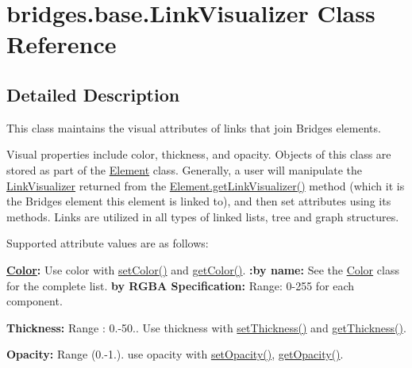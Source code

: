 \hypertarget{classbridges_1_1base_1_1_link_visualizer}{}\section{bridges.\+base.\+Link\+Visualizer Class Reference}
\label{classbridges_1_1base_1_1_link_visualizer}


\subsection{Detailed Description}
This class maintains the visual attributes of links that join Bridges elements. 

Visual properties include color, thickness, and opacity. Objects of this class are stored as part of the \hyperlink{classbridges_1_1base_1_1_element}{Element} class. Generally, a user will manipulate the \hyperlink{classbridges_1_1base_1_1_link_visualizer}{Link\+Visualizer} returned from the \hyperlink{classbridges_1_1base_1_1_element_a7978552c7b36e28c302f611fc1958e7f}{Element.\+get\+Link\+Visualizer()} method (which it is the Bridges element this element is linked to), and then set attributes using its methods. Links are utilized in all types of linked lists, tree and graph structures.

Supported attribute values are as follows\+:

{\bfseries \hyperlink{classbridges_1_1base_1_1_color}{Color}\+:} Use color with \hyperlink{classbridges_1_1base_1_1_link_visualizer_a92f306dbd73b961befa8ab4c0620a89e}{set\+Color()} and \hyperlink{classbridges_1_1base_1_1_link_visualizer_a3ed52d98ecab99c6d8dd136fba913b7d}{get\+Color()}. {\bfseries \+:by name\+:} See the \hyperlink{classbridges_1_1base_1_1_color}{Color} class for the complete list. {\bfseries by R\+G\+BA Specification\+:} Range\+: 0-\/255 for each component.

{\bfseries  Thickness\+: } Range \+: 0.-\/50.. Use thickness with \hyperlink{classbridges_1_1base_1_1_link_visualizer_a702e9ca345d1a4a035baf2041f275849}{set\+Thickness()} and \hyperlink{classbridges_1_1base_1_1_link_visualizer_af1592d2a8664b00c1a51fdc0f8d1860a}{get\+Thickness()}.

{\bfseries  Opacity\+: } Range (0.-\/1.). use opacity with \hyperlink{classbridges_1_1base_1_1_link_visualizer_ac0d59614dbc65ed0a19c25c493a1deaa}{set\+Opacity()}, \hyperlink{classbridges_1_1base_1_1_link_visualizer_a07cdd435a54e4b612ad63614f2a27a4a}{get\+Opacity()}.


